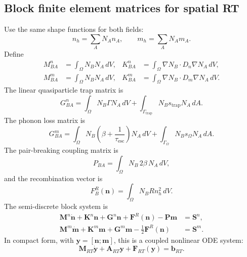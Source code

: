 \documentclass[11pt]{article}
\newcommand{\esc}{\mathrm{esc}}
\newcommand{\trap}{\mathrm{trap}}
\begin{document}
\subsection{Block finite element matrices for spatial RT}
Use the same shape functions for both fields:
\begin{equation}
n_h=\sum_A N_A n_A,
\qquad
m_h=\sum_A N_A m_A.
\end{equation}
Define
\begin{align}
M^n_{BA}&=\int_{\Omega}N_BN_A\,dV,&
K^n_{BA}&=\int_{\Omega}\nabla N_B\cdot D_n\nabla N_A\,dV,\\
M^m_{BA}&=\int_{\Omega}N_BN_A\,dV,&
K^m_{BA}&=\int_{\Omega}\nabla N_B\cdot D_m\nabla N_A\,dV.
\end{align}
The linear quasiparticle trap matrix is
\begin{equation}
G^n_{BA}=\int_{\Omega}N_B\Gamma N_A\,dV+\int_{\Gamma_{\trap}}N_Bs_{\trap}N_A\,dA.
\end{equation}
The phonon loss matrix is
\begin{equation}
G^m_{BA}=\int_{\Omega}N_B\left(\beta+\frac{1}{\tau_{\esc}}\right)N_A\,dV
+\int_{\Gamma_{\Omega}}N_Bs_{\Omega}N_A\,dA.
\end{equation}
The pair-breaking coupling matrix is
\begin{equation}
P_{BA}=\int_{\Omega}N_B\,2\beta\,N_A\,dV,
\end{equation}
and the recombination vector is
\begin{equation}
F_B^R(\bm{n})=\int_{\Omega}N_BRn_h^2\,dV.
\end{equation}
The semi-discrete block system is
\begin{align}
\bm{M}^n\dot{\bm{n}}+\bm{K}^n\bm{n}+\bm{G}^n\bm{n}+\bm{F}^R(\bm{n})-\bm{P}\bm{m}&=\bm{S}^n,\\
\bm{M}^m\dot{\bm{m}}+\bm{K}^m\bm{m}+\bm{G}^m\bm{m}-\frac{1}{2}\bm{F}^R(\bm{n})&=\bm{S}^m.
\end{align}
In compact form, with $\bm{y}=[\bm{n};\bm{m}]$, this is a coupled nonlinear ODE system:
\begin{equation}
\bm{M}_{RT}\dot{\bm{y}}+\bm{A}_{RT}\bm{y}+\bm{F}_{RT}(\bm{y})=\bm{b}_{RT}.
\end{equation}
\end{document}
